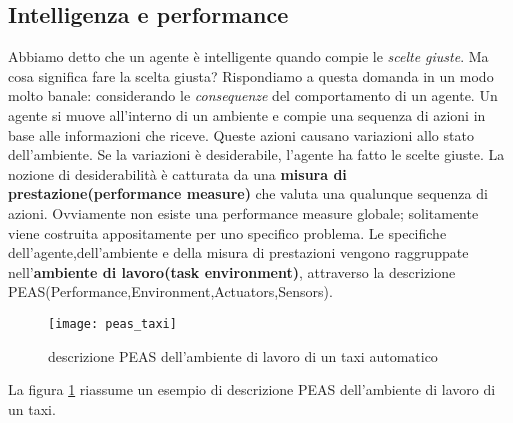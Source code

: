  \subsection{Intelligenza e performance}
 Abbiamo detto che un agente è intelligente quando compie le \emph{scelte giuste}. Ma cosa significa fare la scelta giusta?
 Rispondiamo a questa domanda in un modo molto banale: considerando le \emph{consequenze} del comportamento di un agente.
 Un agente si muove all'interno di un ambiente e compie una sequenza di azioni in base alle informazioni che riceve.
 Queste azioni causano variazioni allo stato dell'ambiente. Se la variazioni è desiderabile, l'agente ha fatto le scelte giuste.
 La nozione di desiderabilità è catturata da una \textbf{misura di prestazione(performance measure)} che valuta una qualunque sequenza di azioni.
 Ovviamente non esiste una performance measure globale; solitamente viene costruita appositamente  per uno specifico problema.
 Le specifiche dell'agente,dell'ambiente e della misura di prestazioni vengono raggruppate nell'\textbf{ambiente di lavoro(task environment)},
 attraverso la descrizione PEAS(Performance,Environment,Actuators,Sensors).\cite{aima}
 \begin{figure}
  \texttt{[image: peas\_taxi]}
  \caption{descrizione PEAS dell'ambiente di lavoro di un taxi automatico}
  \label{fig:taxi}
 \end{figure}
 La figura \ref{fig:taxi} riassume un esempio di descrizione PEAS dell'ambiente di lavoro di un taxi.
